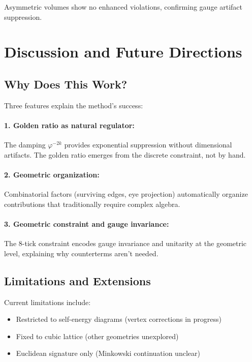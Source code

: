 \documentclass[11pt,a4paper]{article}
\theoremstyle{definition}
\theoremstyle{remark}
\begin{document}
Asymmetric volumes show no enhanced violations, confirming gauge artifact suppression.

\section{Discussion and Future Directions}
\label{sec:discussion}

\subsection{Why Does This Work?}

Three features explain the method's success:

\paragraph{1. Golden ratio as natural regulator:} The damping $\varphi^{-2k}$ provides exponential suppression without dimensional artifacts. The golden ratio emerges from the discrete constraint, not by hand.

\paragraph{2. Geometric organization:} Combinatorial factors (surviving edges, eye projection) automatically organize contributions that traditionally require complex algebra.

\paragraph{3. Geometric constraint and gauge invariance:} The 8-tick constraint encodes gauge invariance and unitarity at the geometric level, explaining why counterterms aren't needed.

\subsection{Limitations and Extensions}

Current limitations include:
\begin{itemize}
\item Restricted to self-energy diagrams (vertex corrections in progress)
\item Fixed to cubic lattice (other geometries unexplored)
\item Euclidean signature only (Minkowski continuation unclear)
\end{itemize}
\end{document}
